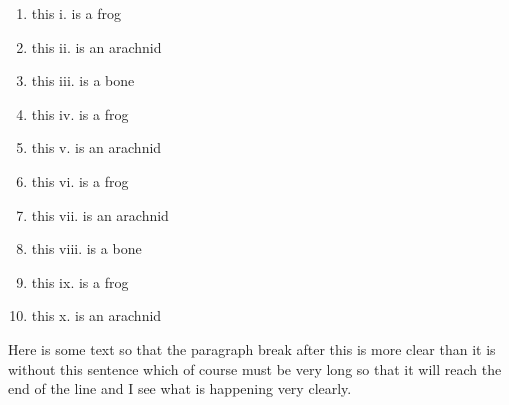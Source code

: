 \documentclass{article}
\begin{document}
\begin{enumerate}
\begin{enumerate}
      \begin{enumerate}
      \item this i. is a frog
      \item this ii. is an arachnid
      \item this iii. is a bone
      \item this iv. is a frog
      \item this v. is an arachnid
      \item this vi. is a frog
      \item this vii. is an arachnid
      \item this viii. is a bone
      \item this ix. is a frog
      \item this x. is an arachnid
      \end{enumerate}
   \end{enumerate}
\end{enumerate}
Here is some text so that the paragraph break after this
is more clear than it is without this sentence which of
course must be very long so that it will reach the end of
the line and I see what is happening very clearly.
\end{document}
